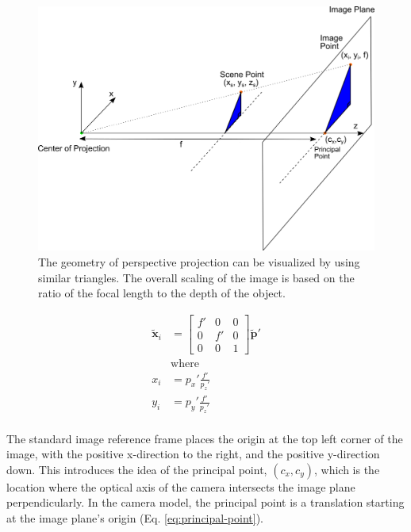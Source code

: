 \begin{figure}[h!]
    \begin{center}
        \includegraphics[width=0.85\linewidth]{figs/background/png/perspective-projection.png}
    \end{center}
    \caption{The geometry of perspective projection can be visualized by using similar triangles. The overall scaling of the image is based on the ratio of the focal length to the depth of the object.                                                 }
    \label{fig:perspective-projection}
\end{figure}


\begin{equation}
    \begin{aligned}
        \tilde{\mathbf{x}}_{i} &= \begin{bmatrix}
            f' & 0 & 0 \\ 0 & f' & 0 \\ 0 & 0 & 1 
        \end{bmatrix} \tilde{\mathbf{p}}' \\
        &\text{where} \\
        x_i &= p_x'\frac{f'}{p_z'} \\
        y_i &= p_y'\frac{f'}{p_z'} \\
    \end{aligned}
    \label{eq:perspective-projection}
\end{equation}

The standard image reference frame places the origin at the top left corner of the image, with the positive x-direction to the right, and the positive y-direction down.
This introduces the idea of the principal point, $(c_x,c_y)$, which is the location where the optical axis of the camera intersects the image plane perpendicularly.
In the camera model, the principal point is a translation starting at the image plane's origin (Eq. \ref{eq:principal-point}).



